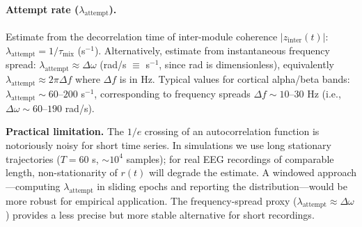 \documentclass[12pt]{article}
\begin{document}
\paragraph{Attempt rate ($\lambda_{\mathrm{attempt}}$).} Estimate from the decorrelation time of inter-module coherence $|z_{\mathrm{inter}}(t)|$: $\lambda_{\mathrm{attempt}} = 1/\tau_{\mathrm{mix}}$ (s$^{-1}$). Alternatively, estimate from instantaneous frequency spread: $\lambda_{\mathrm{attempt}} \approx \Delta\omega$ (rad/s $\equiv$ s$^{-1}$, since rad is dimensionless), equivalently $\lambda_{\mathrm{attempt}} \approx 2\pi\Delta f$ where $\Delta f$ is in Hz. Typical values for cortical alpha/beta bands: $\lambda_{\mathrm{attempt}} \sim 60$--$200$ s$^{-1}$, corresponding to frequency spreads $\Delta f \sim 10$--$30$ Hz (i.e., $\Delta\omega \sim 60$--$190$ rad/s).

\textbf{Practical limitation.} The $1/e$ crossing of an autocorrelation function is notoriously noisy for short time series. In simulations we use long stationary trajectories ($T = 60$ s, $\sim 10^4$ samples); for real EEG recordings of comparable length, non-stationarity of $r(t)$ will degrade the estimate. A windowed approach---computing $\lambda_{\mathrm{attempt}}$ in sliding epochs and reporting the distribution---would be more robust for empirical application. The frequency-spread proxy ($\lambda_{\mathrm{attempt}} \approx \Delta\omega$) provides a less precise but more stable alternative for short recordings.
\end{document}
